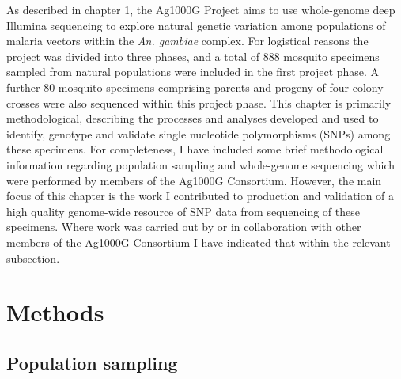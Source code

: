 \documentclass[a4paper,11pt,abstracton,hidelinks]{scrartcl}
\begin{document}
As described in chapter 1, the Ag1000G Project aims to use whole-genome deep Illumina sequencing to explore natural genetic variation among populations of malaria vectors within the \textit{An. gambiae} complex.
%
For logistical reasons the project was divided into three phases, and a total of 888 mosquito specimens sampled from natural populations were included in the first project phase.
%
A further 80 mosquito specimens comprising parents and progeny of four colony crosses were also sequenced within this project phase.
%
This chapter is primarily methodological, describing the processes and analyses developed and used to identify, genotype and validate single nucleotide polymorphisms (SNPs) among these specimens.
%
For completeness, I have included some brief methodological information regarding population sampling and whole-genome sequencing which were performed by members of the Ag1000G Consortium.
%
However, the main focus of this chapter is the work I contributed to production and validation of a high quality genome-wide resource of SNP data from sequencing of these specimens.
%
Where work was carried out by or in collaboration with other members of the Ag1000G Consortium I have indicated that within the relevant subsection.



\section{Methods}


\subsection{Population sampling}
\end{document}
